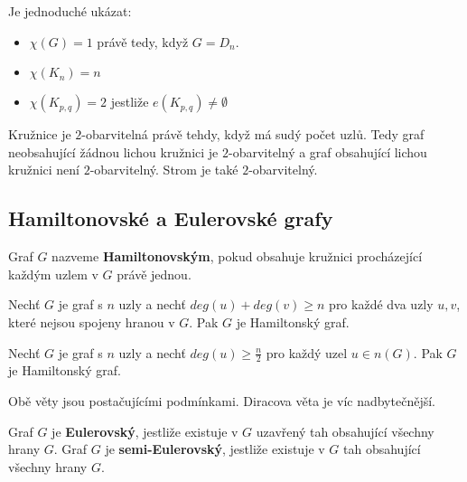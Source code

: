 \begin{theorem}
Je jednoduché ukázat:
\begin{itemize}
    \item $\chi(G)=1$ právě tedy, když $G=D_n$.
    \item $\chi(K_n)=n$
    \item $\chi(K_{p,q})=2$ jestliže $e(K_{p,q}) \ne \emptyset$
\end{itemize}
\end{theorem}

\begin{theorem}
Kružnice je $2$-obarvitelná právě tehdy, když má sudý počet uzlů. Tedy graf neobsahující žádnou lichou kružnici je $2$-obarvitelný a graf obsahující lichou kružnici není $2$-obarvitelný. Strom je také $2$-obarvitelný.
\end{theorem}

\subsection{Hamiltonovské a Eulerovské grafy}

\begin{definition}
Graf $G$ nazveme \textbf{Hamiltonovským}, pokud obsahuje kružnici procházející každým uzlem v $G$ právě jednou.
\end{definition}

\begin{theorem}[Ore]
Nechť $G$ je graf s $n$ uzly a nechť $deg(u) + deg(v) \geq n$ pro každé dva uzly $u,v$, které nejsou spojeny hranou v $G$. Pak $G$ je Hamiltonský graf.
\end{theorem}

\begin{theorem}[Dirac]
Nechť $G$ je graf s $n$ uzly a nechť $deg(u) \geq \frac{n}{2}$ pro každý uzel $u \in n(G)$. Pak $G$ je Hamiltonský graf.
\end{theorem}

Obě věty jsou postačujícími podmínkami. Diracova věta je víc nadbytečnější.

\begin{definition}
Graf $G$ je \textbf{Eulerovský}, jestliže existuje v $G$ uzavřený tah obsahující všechny hrany $G$. Graf $G$ je \textbf{semi-Eulerovský}, jestliže existuje v $G$ tah obsahující všechny hrany $G$.
\end{definition}

